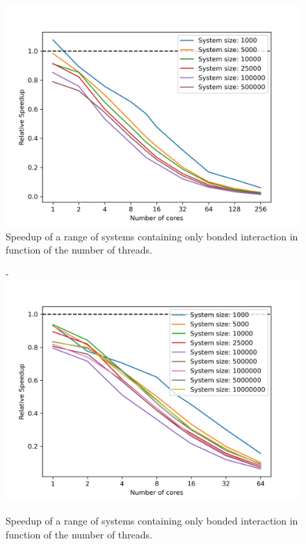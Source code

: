 \documentclass[conference]{IEEEtran}
\begin{document}
        \begin{figure}[H]
            \centering
            \includegraphics[width=\linewidth]{./images/bonds_scaling.png} %
            \caption{Speedup of a range of systems containing only bonded interaction in function of the number 
            of threads.}\label{fig:bonded-speedup}
        \end{figure}
        \begin{figure}[H]
            \centering-
            \includegraphics[width=\linewidth]{./images/bonds2_scaling.png} %
            \caption{Speedup of a range of systems containing only bonded interaction in function of the number 
            of threads.}\label{fig:bonded2-speedup}
        \end{figure}
    
\end{document}
